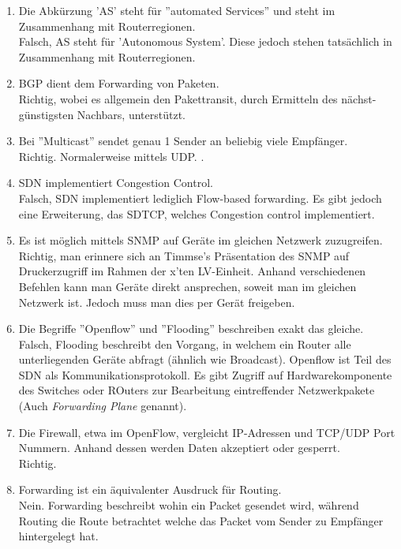 \documentclass{scrartcl}
\begin{document}
\begin{enumerate}
        \item Die Abkürzung 'AS' steht für ''automated Services'' und steht im Zusammenhang mit Routerregionen.\\
        Falsch, AS steht für 'Autonomous System'. Diese jedoch stehen tatsächlich in Zusammenhang mit Routerregionen.
        
        \item BGP dient dem Forwarding von Paketen.\\
        Richtig, wobei es allgemein den Pakettransit, durch Ermitteln des nächst-günstigsten Nachbars, unterstützt.
        
        \item Bei ''Multicast'' sendet genau 1 Sender an beliebig viele Empfänger.\\
        Richtig. Normalerweise mittels UDP.
        .
        \item SDN implementiert Congestion Control.\\
        Falsch, SDN implementiert lediglich Flow-based forwarding. Es gibt jedoch eine Erweiterung, das SDTCP, welches Congestion control implementiert. 
        
        \item Es ist möglich mittels SNMP auf Geräte im gleichen Netzwerk zuzugreifen.\\
        Richtig, man erinnere sich an Timmse's Präsentation des SNMP auf Druckerzugriff im Rahmen der x'ten LV-Einheit. Anhand verschiedenen Befehlen kann man Geräte direkt ansprechen, soweit man im gleichen Netzwerk ist. Jedoch muss man dies per Gerät freigeben.
        
        \item Die Begriffe ''Openflow'' und ''Flooding'' beschreiben exakt das gleiche.\\
        Falsch, Flooding beschreibt den Vorgang, in welchem ein Router alle unterliegenden Geräte abfragt (ähnlich wie Broadcast). Openflow ist Teil des SDN als Kommunikationsprotokoll. Es gibt Zugriff auf Hardwarekomponente des Switches oder ROuters zur Bearbeitung eintreffender Netzwerkpakete (Auch \textit{Forwarding Plane} genannt).
        
        \item Die Firewall, etwa im OpenFlow, vergleicht IP-Adressen und TCP/UDP Port Nummern. Anhand dessen werden Daten akzeptiert oder gesperrt.\\
        Richtig.
        
        \item Forwarding ist ein äquivalenter Ausdruck für Routing.\\
        Nein. Forwarding beschreibt wohin ein Packet gesendet wird, während Routing die Route betrachtet welche das Packet vom Sender zu Empfänger hintergelegt hat.
        

\end{enumerate}
\end{document}
